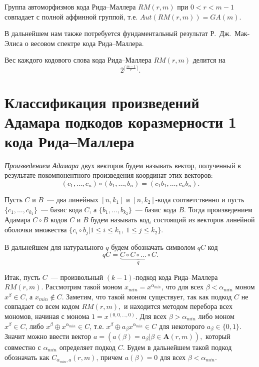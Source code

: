 \begin{proposition}
	\label{th1}
	Группа автоморфизмов кода Рида--Маллера \(RM(r,m)\) при \(0<r<m-1\) совпадает с полной аффинной группой, т.е.
	\(Aut(RM(r,m))=GA(m).\)
\end{proposition}

В дальнейшем нам также потребуется фундаментальный результат Р.~Дж.~Мак-Элиса о весовом спектре кода Рида--Маллера.

\begin{proposition}
	\label{th_mceliece}
	Вес каждого кодового слова кода Рида--Маллера \(RM(r,m)\) делится на
	\[2^{\lceil \frac{m-1}{r}\rceil}.\]
\end{proposition}

\section {Классификация произведений Адамара подкодов коразмерности 1 кода Рида--Маллера}

\emph{Произведением Адамара} двух векторов будем называть вектор, полученный в результате покомпонентного произведения координат этих векторов:
\[
	(c_1,\ldots, c_n)\circ (b_1,\ldots, b_n)=(c_1b_1,\ldots, c_nb_n).

\]

\begin{definition}
	Пусть \(C\) и \(B\)~--- два линейных \([n,k_1]\) и \([n,k_2]\)-кода соответственно и пусть \(\{c_1,\ldots, c_{k_1}\}\)~--- базис кода $C$, а \(\{b_1,\ldots,b_{k_2}\}\)~--- базис кода \(B\).
	Тогда произведением Адамара \(C\circ B\) кодов \(C\) и \(B\) будем называть код, состоящий из векторов линейной оболочки множества \(\{c_i\circ b_j|1\leqslant i\leqslant k_1,\ 1\leqslant j\leqslant k_2\}\).
\end{definition}

В дальнейшем для натурального \(q\) будем обозначать символом \(qC\) код
\begin{displaymath}
	qC=\underbrace{C\circ C\circ\ldots\circ C}_{q}.
\end{displaymath}

Итак, пусть \(C\)~--- произвольный \((k-1)\)-подкод кода Рида--Маллера \(RM(r,m)\).
Рассмотрим такой моном \(x_{min}=x^{\alpha_{min}}\), что для всех \(\beta<\alpha_{min}\) моном \(x^{\beta}\in C\), а \(x_{min}\not\in C\).
Заметим, что такой моном существует, так как подкод \(C\) не совпадает со всем кодом \(RM(r,m),\) и находится методом перебора всех мономов, начиная с монома \(1=x^{(0,0,\ldots,0)}\).
Для всех \(\beta>\alpha_{min}\) либо моном \(x^{\beta}\in C\), либо \(x^{\beta}\oplus x^{\alpha_{min}} \in C\), т.е.
\(x^{\beta}\oplus a_{\beta}x^{\alpha_{min}}\in C\) для некоторого \(a_{\beta}\in\{0,1\}.\) Значит можно ввести вектор \(a=(a(\beta)=a_{\beta}|\beta\in \mathbf{A}(r,m)),\) который совместно с \(\alpha_{min}\) определяет подкод \(C\).
Будем в дальнейшем такой подкод обозначать как \(C_{\alpha_{min},a}(r,m)\), причем \(a(\beta)=0\) для всех \(\beta<\alpha_{min}\).

